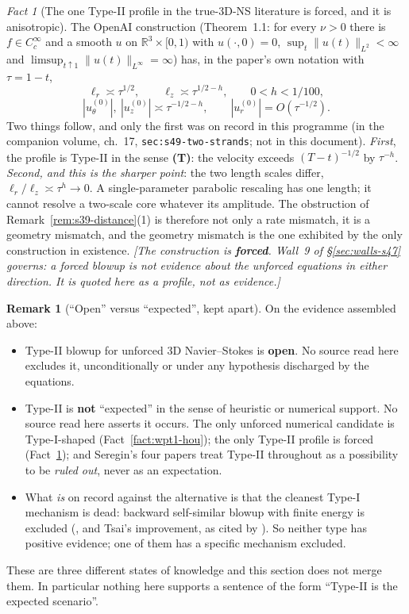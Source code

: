 \documentclass[11pt]{article}
\theoremstyle{definition}
\newtheorem{remark}[theorem]{Remark}
\theoremstyle{remark}
\newtheorem{fact}[theorem]{Fact}
\newcommand{\R}{\mathbb{R}}
\begin{document}
\begin{fact}[The one Type-II profile in the true-3D-NS literature is forced,
  and it is anisotropic]\label{fact:wpt1-openai}
  The OpenAI construction \cite{OpenAI2026} (Theorem~1.1: for every $\nu>0$
  there is $f\in C_c^\infty$ and a smooth $u$ on $\R^3\times[0,1)$ with
  $u(\cdot,0)=0$, $\sup_t\|u(t)\|_{L^2}<\infty$ and
  $\limsup_{t\uparrow1}\|u(t)\|_{L^\infty}=\infty$) has, in the paper's own
  notation with $\tau=1-t$,
  \[
    \ell_r\asymp\tau^{1/2},\qquad
    \ell_z\asymp\tau^{1/2-h},\qquad 0<h<1/100,
  \]
  \[
    |u^{(0)}_\theta|,\ |u^{(0)}_z|\asymp\tau^{-1/2-h},
    \qquad |u^{(0)}_r|=O(\tau^{-1/2}).
  \]
  Two things follow, and only the first was on record in this programme (in
  the companion volume, ch.~17, \texttt{sec:s49-two-strands}; not in this
  document). \emph{First}, the
  profile is Type-II in the sense \textbf{(T)}: the velocity exceeds
  $(T-t)^{-1/2}$ by $\tau^{-h}$. \emph{Second, and this is the sharper
  point}: the two length scales differ, $\ell_r/\ell_z\asymp\tau^h\to0$. A
  single-parameter parabolic rescaling has one length; it cannot resolve a
  two-scale core whatever its amplitude. The obstruction of
  Remark~\ref{rem:s39-distance}(1) is therefore not only a rate mismatch, it
  is a geometry mismatch, and the geometry mismatch is the one exhibited by
  the only construction in existence.
  \emph{[The construction is \textbf{forced}. Wall~9 of
  \S\ref{sec:walls-s47} governs: a forced blowup is not evidence about the
  unforced equations in either direction. It is quoted here as a
  \emph{profile}, not as evidence.]}
\end{fact}

\begin{remark}[``Open'' versus ``expected'', kept apart]
  \label{rem:wpt1-open-vs-expected}
  On the evidence assembled above:
  \begin{itemize}
    \item Type-II blowup for unforced 3D Navier--Stokes is \textbf{open}. No
      source read here excludes it, unconditionally or under any hypothesis
      discharged by the equations.
    \item Type-II is \textbf{not} ``expected'' in the sense of heuristic or
      numerical support. No source read here asserts it occurs. The only
      unforced numerical candidate is Type-I-shaped
      (Fact~\ref{fact:wpt1-hou}); the only Type-II profile is forced
      (Fact~\ref{fact:wpt1-openai}); and Seregin's four papers treat Type-II
      throughout as a possibility to be \emph{ruled out}, never as an
      expectation.
    \item What \emph{is} on record against the alternative is that the
      cleanest Type-I mechanism is dead: backward self-similar blowup with
      finite energy is excluded (\cite{NecasRuzickaSverak1996}, and Tsai's
      improvement, as cited by \cite{Hou2022}). So neither type has positive
      evidence; one of them has a specific mechanism excluded.
  \end{itemize}
  These are three different states of knowledge and this section does not
  merge them. In particular nothing here supports a sentence of the form
  ``Type-II is the expected scenario''.
\end{remark}
\end{document}
